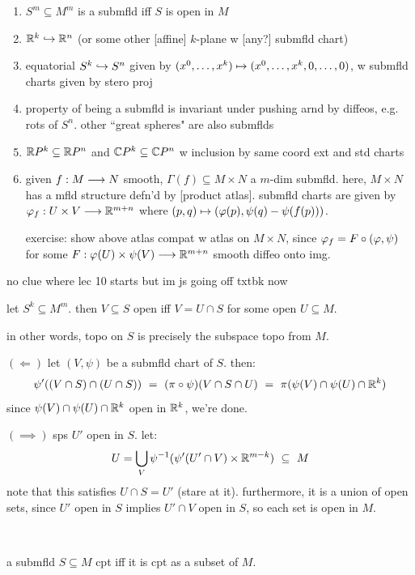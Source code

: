 \begin{xmp}[source=Primary Source Material] \vspace{-0.2in}
	\begin{enumerate}
		\item[(0)] $S^{m}\subseteq M^{m}$ is a submfld iff $S$ is open in $M$
		\item[(1)] $\mathbb{R}^{k}\hookrightarrow\mathbb{R}^{n}$ (or some other [affine] $k$-plane w [any?] submfld chart)
		\item[(2)] equatorial $S^{k}\hookrightarrow S^{n}$ given by $(x^{0},\dots,x^{k})\mapsto(x^{0},\dots,x^{k},0,\dots,0)$,
			w submfld charts given by stero proj
		\item[(3)] property of being a submfld is invariant under pushing arnd by diffeos,
			e.g. rots of $S^{n}$. other ``great spheres" are also submflds
		\item[(4)] $\mathbb{R} P^{k}\subseteq\mathbb{R} P^{n}$ and $\mathbb{C} P^{k}\subseteq\mathbb{C} P^{n}$
			w inclusion by same coord ext and std charts
		\item[(5)] given $f:M\longrightarrow N$ smooth, $\Gamma(f)\subseteq M\times N$ a $m$-dim submfld.
			here, $M\times N$ has a mfld structure defn'd by [product atlas].
			submfld charts are given by $\varphi_{f}:U\times V\longrightarrow\mathbb{R}^{m+n}$
			where $(p,q)\mapsto(\varphi(p),\psi(q)-\psi(f(p)))$.

			exercise: show above atlas compat w atlas on $M\times N$, since
			$\varphi_{f}=F\circ(\varphi,\psi)$ for some $F:\varphi(U)\times\psi(V)\longrightarrow\mathbb{R}^{m+n}$
			smooth diffeo onto img.
	\end{enumerate}
\end{xmp}

no clue where lec 10 starts but im js going off txtbk now

\begin{prop}
	let $S^{k}\subseteq M^{m}$.
	then $V\subseteq S$ open iff $V=U\cap S$ for some open $U\subseteq M$.
\end{prop}
in other words, topo on $S$ is precisely the subspace topo from $M$.

\begin{pf}[source=Primary Source Material]
	$(\Longleftarrow)$ let $(V,\psi)$ be a submfld chart of $S$. then:
	\begin{equation*}
		\psi'((V\cap S)\cap(U\cap S)) \ = \ (\pi\circ\psi)(V\cap S\cap U)
		\ = \ \pi(\psi(V)\cap\psi(U)\cap\bR^{k})
	\end{equation*}
	since $\psi(V)\cap\psi(U)\cap\mathbb{R}^{k}$ open in $\mathbb{R}^{k}$, we're done.

	$(\implies)$ sps $U'$ open in $S$. let:
	\begin{equation*}
		U=\bigcup_{V}\psi^{-1}(\psi'(U'\cap V)\times\mathbb{R}^{m-k}) \ \subseteq \ M
	\end{equation*}
	note that this satisfies $U\cap S=U'$ (stare at it).
	furthermore, it is a union of open sets, since $U'$ open in $S$ implies
	$U'\cap V$ open in $S$, so each set is open in $M$.
\end{pf} \

\begin{crll}
	a submfld $S\subseteq M$ cpt iff it is cpt as a subset of $M$.
\end{crll}
